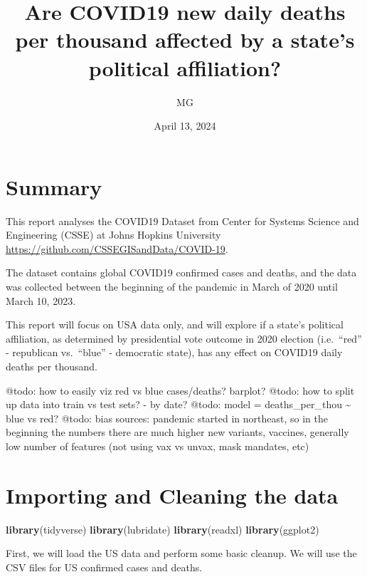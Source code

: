 \documentclass[
]{article}
\title{Are COVID19 new daily deaths per thousand affected by a state's
political affiliation?}
\author{MG}
\date{April 13, 2024}
\newenvironment{Shaded}{\begin{snugshade}}{\end{snugshade}}
\newcommand{\FunctionTok}[1]{\textcolor[rgb]{0.13,0.29,0.53}{\textbf{#1}}}
\newcommand{\NormalTok}[1]{#1}
\begin{document}
\maketitle

\hypertarget{summary}{%
\section{Summary}\label{summary}}

This report analyses the COVID19 Dataset from Center for Systems Science
and Engineering (CSSE) at Johns Hopkins University
\url{https://github.com/CSSEGISandData/COVID-19}.

The dataset contains global COVID19 confirmed cases and deaths, and the
data was collected between the beginning of the pandemic in March of
2020 until March 10, 2023.

This report will focus on USA data only, and will explore if a state's
political affiliation, as determined by presidential vote outcome in
2020 election (i.e.~``red'' - republican vs.~``blue'' - democratic
state), has any effect on COVID19 daily deaths per thousand.

@todo: how to easily viz red vs blue cases/deaths? barplot? @todo: how
to split up data into train vs test sets? - by date? @todo: model =
deaths\_per\_thou \textasciitilde{} blue vs red? @todo: bias sources:
pandemic started in northeast, so in the beginning the numbers there are
much higher new variants, vaccines, generally low number of features
(not using vax vs unvax, mask mandates, etc)

\hypertarget{importing-and-cleaning-the-data}{%
\section{Importing and Cleaning the
data}\label{importing-and-cleaning-the-data}}

\begin{Shaded}
\begin{Highlighting}[]
\FunctionTok{library}\NormalTok{(tidyverse)}
\FunctionTok{library}\NormalTok{(lubridate)}
\FunctionTok{library}\NormalTok{(readxl)}
\FunctionTok{library}\NormalTok{(ggplot2)}
\end{Highlighting}
\end{Shaded}

First, we will load the US data and perform some basic cleanup. We will
use the CSV files for US confirmed cases and deaths.
\end{document}
